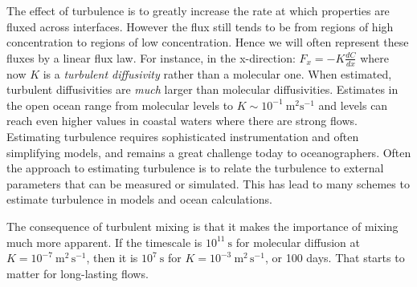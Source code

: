 The effect of turbulence is to greatly increase the rate at which properties are fluxed across interfaces.  However the flux still tends to be from regions of high concentration to regions of low concentration.  Hence we will often represent these fluxes by a linear flux law.  For instance, in the x-direction: $F_x = -K \frac{dC}{dx}$ where now $K$ is a \emph{turbulent diffusivity} rather than a molecular one.  When estimated, turbulent diffusivities are \emph{much} larger than molecular diffusivities.  Estimates in the open ocean range from molecular levels to $K\sim 10^{-1}\ \mathrm{m^2s^{-1}}$ and levels can reach even higher values in coastal waters where there are strong flows.  Estimating turbulence requires sophisticated instrumentation and often simplifying models, and remains a great challenge today to oceanographers.  Often the approach to estimating turbulence is to relate the turbulence to external parameters that can be measured or simulated.  This has lead to many schemes to estimate turbulence in models and ocean calculations.  

The consequence of turbulent mixing is that it makes the importance of mixing much more apparent.  If the timescale is $10^{11}\ \mathrm{s}$ for molecular diffusion at $K=10^{-7}\ \mathrm{m^2\,s^{-1}}$, then it is $10^{7}\ \mathrm{s}$ for $K=10^{-3}\ \mathrm{m^2\,s^{-1}}$, or 100 days.  That starts to matter for long-lasting flows.  

